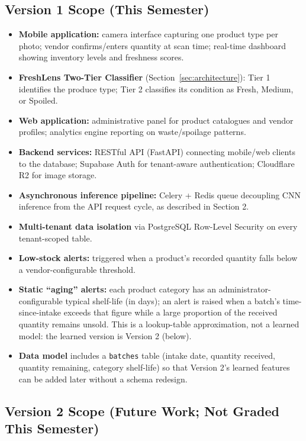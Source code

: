 \documentclass[12pt,a4paper]{article}
\begin{document}
\subsection{Version 1 Scope (This Semester)}
\begin{itemize}[leftmargin=1.2cm]
    \item \textbf{Mobile application:} camera interface capturing one product type per photo; vendor confirms/enters quantity at scan time; real-time dashboard showing inventory levels and freshness scores.
    \item \textbf{FreshLens Two-Tier Classifier} (Section~\ref{sec:architecture}): Tier 1 identifies the produce type; Tier 2 classifies its condition as Fresh, Medium, or Spoiled.
    \item \textbf{Web application:} administrative panel for product catalogues and vendor profiles; analytics engine reporting on waste/spoilage patterns.
    \item \textbf{Backend services:} RESTful API (FastAPI) connecting mobile/web clients to the database; Supabase Auth for tenant-aware authentication; Cloudflare R2 for image storage.
    \item \textbf{Asynchronous inference pipeline:} Celery + Redis queue decoupling CNN inference from the API request cycle, as described in Section 2.
    \item \textbf{Multi-tenant data isolation} via PostgreSQL Row-Level Security on every tenant-scoped table.
    \item \textbf{Low-stock alerts:} triggered when a product's recorded quantity falls below a vendor-configurable threshold.
    \item \textbf{Static ``aging'' alerts:} each product category has an administrator-configurable typical shelf-life (in days); an alert is raised when a batch's time-since-intake exceeds that figure while a large proportion of the received quantity remains unsold. This is a lookup-table approximation, not a learned model: the learned version is Version 2 (below).
    \item \textbf{Data model} includes a \texttt{batches} table (intake date, quantity received, quantity remaining, category shelf-life) so that Version 2's learned features can be added later without a schema redesign.
\end{itemize}

\subsection{Version 2 Scope (Future Work; Not Graded This Semester)}
\end{document}
